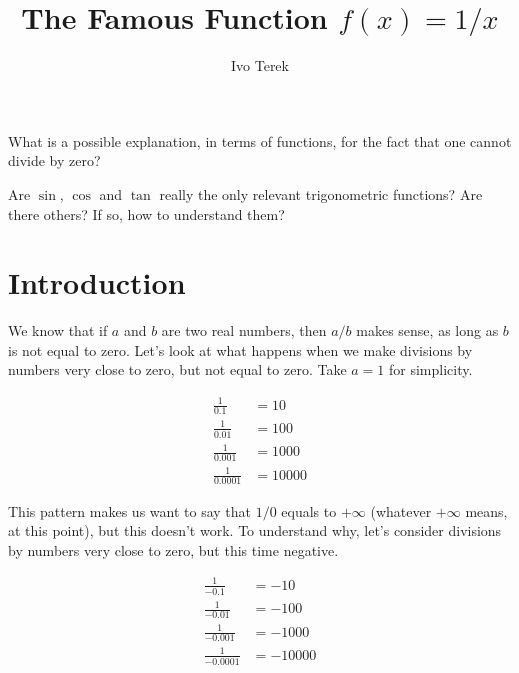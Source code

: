 \documentclass{ximera}
\author{Ivo Terek}
\title{The Famous Function $f(x)=1/x$}
\begin{document}
\begin{abstract}
  
\end{abstract}
\maketitle



\begin{motivatingQuestions}
\item What is a possible explanation, in terms of functions, for the fact that one cannot divide by zero? 
\item Are $\sin$, $\cos$ and $\tan$ really the only relevant trigonometric functions? Are there others? If so, how to understand them?
\end{motivatingQuestions}



\section{Introduction}

We know that if $a$ and $b$ are two real numbers, then $a/b$ makes sense, as long as $b$ is not equal to zero. Let's look at what happens when we make divisions by numbers very close to zero, but not equal to zero. Take $a=1$ for simplicity.

\begin{align*}
  \frac{1}{0.1} &= 10 \\ \frac{1}{0.01} &= 100 \\ \frac{1}{0.001} &= 1000 \\ \frac{1}{0.0001} &= 10000
\end{align*}

This pattern makes us want to say that $1/0$ equals to $+\infty$ (whatever $+\infty$ means, at this point), but this doesn't work. To understand why, let's consider divisions by numbers very close to zero, but this time negative. 

\begin{align*}
  \frac{1}{-0.1} &= -10 \\ \frac{1}{-0.01} &= -100 \\ \frac{1}{-0.001} &= -1000 \\ \frac{1}{-0.0001} &= -10000
\end{align*}
\end{document}
